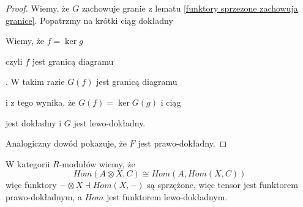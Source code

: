 \begin{proof}
  Wiemy, że $G$ zachowuje granie z lematu \ref{funktory sprzezone zachowuja granice}. Popatrzmy na krótki ciąg dokładny 
  \begin{center}\end{center} 
  Wiemy, że $f=\ker g$ 
  \begin{center}\end{center}
  czyli $f$ jest granicą diagramu . W takim razie $G(f)$ jest granicą diagramu  i z tego wynika, że $G(f)=\ker G(g)$ i ciąg 
  \begin{center}\end{center}
  jest dokładny i $G$ jest lewo-dokładny.

  Analogiczny dowód pokazuje, że $F$ jest prawo-dokładny.
\end{proof}

\begin{conclusion}
  W kategorii $R$-modułów wiemy, że 
  $$Hom(A\otimes X, C)\cong Hom(A, Hom(X, C))$$
  więc funktory $-\otimes X \dashv Hom(X, -)$ są sprzężone, więc tensor jest funktorem prawo-dokładnym, a $Hom$ jest funktorem lewo-dokładnym.
\end{conclusion}

